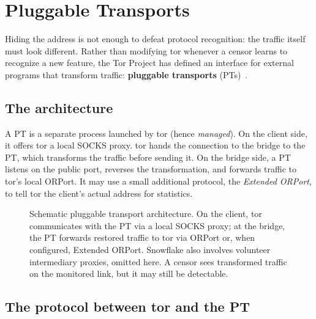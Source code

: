 \section{Pluggable Transports}\label{sec:cens-pt}

Hiding the address is not enough to defeat protocol recognition: the traffic itself must look different. Rather than modifying tor whenever a censor learns to recognize a new feature, the Tor Project has defined an interface for external programs that transform traffic: \textbf{pluggable transports} (PTs)~.

\subsection{The architecture}

A PT is a separate process launched by tor (hence \emph{managed}). On the client side, it offers tor a local SOCKS proxy. tor hands the connection to the bridge to the PT, which transforms the traffic before sending it. On the bridge side, a PT listens on the public port, reverses the transformation, and forwards traffic to tor's local ORPort. It may use a small additional protocol, the \emph{Extended ORPort}, to tell tor the client's actual address for statistics.

\begin{figure}[htbp]
\centering

\caption{Schematic pluggable transport architecture. On the client, tor communicates with the PT via a local SOCKS proxy; at the bridge, the PT forwards restored traffic to tor via ORPort or, when configured, Extended ORPort. Snowflake also involves volunteer intermediary proxies, omitted here. A censor sees transformed traffic on the monitored link, but it may still be detectable.}
\label{fig:pt}
\end{figure}

\subsection{The protocol between tor and the PT}

